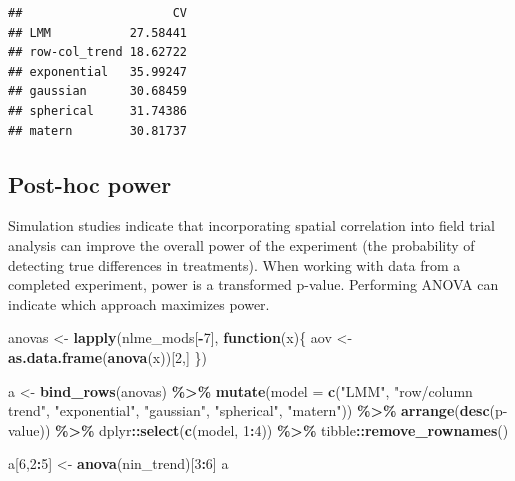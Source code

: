 \documentclass[
]{book}
\newenvironment{Shaded}{\begin{snugshade}}{\end{snugshade}}
\newcommand{\AttributeTok}[1]{\textcolor[rgb]{0.13,0.29,0.53}{#1}}
\newcommand{\ControlFlowTok}[1]{\textcolor[rgb]{0.13,0.29,0.53}{\textbf{#1}}}
\newcommand{\DecValTok}[1]{\textcolor[rgb]{0.00,0.00,0.81}{#1}}
\newcommand{\FunctionTok}[1]{\textcolor[rgb]{0.13,0.29,0.53}{\textbf{#1}}}
\newcommand{\NormalTok}[1]{#1}
\newcommand{\OtherTok}[1]{\textcolor[rgb]{0.56,0.35,0.01}{#1}}
\newcommand{\SpecialCharTok}[1]{\textcolor[rgb]{0.81,0.36,0.00}{\textbf{#1}}}
\newcommand{\StringTok}[1]{\textcolor[rgb]{0.31,0.60,0.02}{#1}}
\begin{document}
\begin{verbatim}
##                     CV
## LMM           27.58441
## row-col_trend 18.62722
## exponential   35.99247
## gaussian      30.68459
## spherical     31.74386
## matern        30.81737
\end{verbatim}

\hypertarget{post-hoc-power}{%
\subsection{Post-hoc power}\label{post-hoc-power}}

Simulation studies indicate that incorporating spatial correlation into field trial analysis can improve the overall power of the experiment (the probability of detecting true differences in treatments). When working with data from a completed experiment, power is a transformed p-value. Performing ANOVA can indicate which approach maximizes power.

\begin{Shaded}
\begin{Highlighting}[]
\NormalTok{anovas }\OtherTok{\textless{}{-}} \FunctionTok{lapply}\NormalTok{(nlme\_mods[}\SpecialCharTok{{-}}\DecValTok{7}\NormalTok{], }\ControlFlowTok{function}\NormalTok{(x)\{ }
\NormalTok{  aov }\OtherTok{\textless{}{-}} \FunctionTok{as.data.frame}\NormalTok{(}\FunctionTok{anova}\NormalTok{(x))[}\DecValTok{2}\NormalTok{,]}
\NormalTok{  \})}

\NormalTok{a }\OtherTok{\textless{}{-}} \FunctionTok{bind\_rows}\NormalTok{(anovas) }\SpecialCharTok{\%\textgreater{}\%} \FunctionTok{mutate}\NormalTok{(}\AttributeTok{model =} \FunctionTok{c}\NormalTok{(}\StringTok{"LMM"}\NormalTok{, }\StringTok{"row/column trend"}\NormalTok{, }\StringTok{"exponential"}\NormalTok{, }
                                       \StringTok{"gaussian"}\NormalTok{, }\StringTok{"spherical"}\NormalTok{, }\StringTok{"matern"}\NormalTok{)) }\SpecialCharTok{\%\textgreater{}\%} 
  \FunctionTok{arrange}\NormalTok{(}\FunctionTok{desc}\NormalTok{(}\StringTok{\textasciigrave{}}\AttributeTok{p{-}value}\StringTok{\textasciigrave{}}\NormalTok{)) }\SpecialCharTok{\%\textgreater{}\%}\NormalTok{ dplyr}\SpecialCharTok{::}\FunctionTok{select}\NormalTok{(}\FunctionTok{c}\NormalTok{(model, }\DecValTok{1}\SpecialCharTok{:}\DecValTok{4}\NormalTok{)) }\SpecialCharTok{\%\textgreater{}\%}\NormalTok{ tibble}\SpecialCharTok{::}\FunctionTok{remove\_rownames}\NormalTok{() }

\NormalTok{a[}\DecValTok{6}\NormalTok{,}\DecValTok{2}\SpecialCharTok{:}\DecValTok{5}\NormalTok{] }\OtherTok{\textless{}{-}} \FunctionTok{anova}\NormalTok{(nin\_trend)[}\DecValTok{3}\SpecialCharTok{:}\DecValTok{6}\NormalTok{]}
\NormalTok{a}
\end{Highlighting}
\end{Shaded}
\end{document}
